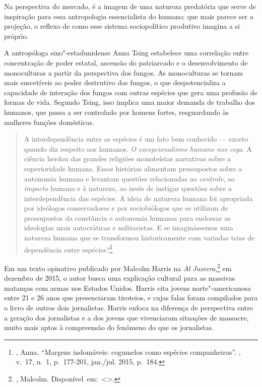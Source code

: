 Na perspectiva do mercado, é a imagem de uma natureza
predatória que serve de inspiração para essa antropologia essencialista
do humano; que mais parece ser a projeção, o reflexo de como esse
sistema sociopolítico produtivo imagina a si próprio.

A antropóloga sino"-estadunidense Anna Tsing estabelece uma correlação entre
concentração de poder estatal, ascensão do patriarcado e o
desenvolvimento de monoculturas a partir da perspectiva dos fungos. As
monoculturas se tornam mais suscetíveis ao poder destrutivo dos fungos,
o que despotencializa a capacidade de interação dos fungos com outras
espécies que gera uma profusão de formas de vida. Segundo Tsing, isso
implica uma maior demanda de trabalho dos humanos, que passa a ser
controlado por homens fortes, resguardando às mulheres funções
domésticas.

\begin{quote}
A interdependência entre as espécies é um fato bem conhecido --- exceto
quando diz respeito aos humanos. \emph{O excepcionalismo humano nos
cega}. A ciência herdou das grandes religiões monoteístas narrativas
sobre a superioridade humana. Essas histórias alimentam pressupostos
sobre a autonomia humana e levantam questões relacionadas ao
\emph{controle}, ao \emph{impacto} humano e à natureza, ao invés de
instigar questões sobre a interdependência das espécies. A ideia de
natureza humana foi apropriada por ideólogos conservadores e por
sociobiólogos que se utilizam de pressupostos da constância e autonomia
humanas para endossar as ideologias mais autocráticas e militaristas. E
se imaginássemos uma natureza humana que se transformou historicamente
com variadas teias de dependência entre espécies?\footnote{,
  Anna. ``Margens indomáveis: cogumelos como espécies companheiras''. {}, v.~17, n.~1, p.~177-201, jan./jul. 2015, p.~184.}
\end{quote}

\asterisc

Em um texto opinativo publicado por Malcolm Harris na \emph{Al Jazeera},\footnote{, Malcolm. \mbox{Disponível em: \textless{}{}\textgreater{}.}}
em dezembro de 2015, o autor busca uma explicação cultural para as
massivas matanças com armas nos Estados Unidos. Harris cita jovens norte"-americanosa entre 21 e 26 anos que presenciaram tiroteios, e cujas
falas foram compilados para o livro de outros dois jornalistas. Harris
enfoca na diferença de perspectiva entre a geração dos jornalistas e a
dos jovens que vivenciaram situações de massacre, muito mais aptos à
compreensão do fenômeno do que os jornalistas.

